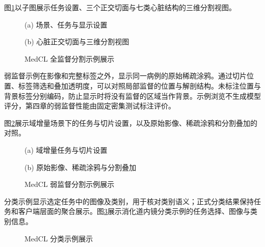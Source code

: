 图\ref{fig:medcl-segmentation-example-ui}以子图展示任务设置、三个正交切面与七类心脏结构的三维分割视图。
\begin{figure}[htbp]
\centering
\begin{minipage}{0.96\linewidth}
\centering
{}
\par\small (a) 场景、任务与显示设置
\end{minipage}
\par\vspace{5pt}
\begin{minipage}{0.96\linewidth}
\centering
{}
\par\small (b) 心脏正交切面与三维分割视图
\end{minipage}
\caption{MedCL 全监督分割示例展示}
\label{fig:medcl-segmentation-example-ui}
\end{figure}

弱监督示例在影像和完整标签之外，显示同一病例的原始稀疏涂鸦。通过切片位置、标签筛选和叠加透明度，可以对照局部监督的位置与解剖结构。未标注位置与背景标签分别编码，防止显示时将没有监督的区域当作背景。示例浏览不生成模型评分，第四章的弱监督性能由固定密集测试标注评价。


图\ref{fig:medcl-weak-example-ui}展示域增量场景下的任务与切片设置，以及原始影像、稀疏涂鸦和分割叠加的对照。
\begin{figure}[htbp]
\centering
\begin{minipage}{0.96\linewidth}
\centering
{}
\par\small (a) 域增量任务与切片设置
\end{minipage}
\par\vspace{6pt}
\begin{minipage}{0.96\linewidth}
\centering
{}
\par\small (b) 原始影像、稀疏涂鸦与分割叠加
\end{minipage}
\caption{MedCL 弱监督分割示例展示}
\label{fig:medcl-weak-example-ui}
\end{figure}

分类示例显示选定任务中的图像及类别，用于核对类别语义；正式分类结果保持任务和客户端层面的聚合展示。图\ref{fig:medcl-classification-example-ui}展示消化道内镜分类示例的任务选择、图像与类别信息。

\begin{figure}[htbp]
\centering
{}
\caption{MedCL 分类示例展示}
\label{fig:medcl-classification-example-ui}
\end{figure}

